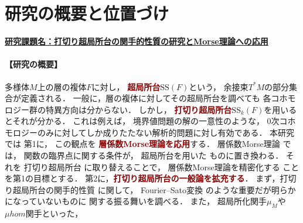 \documentclass[11pt,a4paper,uplatex,dvipdfmx]{ujarticle} 		%
\newcommand{\研究課題名}{打切り超局所台の関手的性質の研究とMorse理論への応用}
\newcommand{\研究機関名}{北海道大学}
\newcommand{\研究代表者氏名}{大柴寿浩}
\begin{document}

\section{研究の概要と位置づけ}

\noindent
\underline{\textbf{研究課題名：\研究課題名}}
\vspace{-10pt}
\paragraph{【研究の概要】}
多様体\(M\)上の層の複体\(F\)に対し，
\textcolor{darkred}{\textbf{超局所台}}\(\mathrm{SS}(F)\)という，
余接束\(T^{\ast}M\)の部分集合が定義される．
一般に，層の複体に対してその超局所台を調べても
各コホモロジー群の特異方向は分からない．
しかし，
\textcolor{darkred}{\textbf{打切り超局所台}}\(
	\mathrm{SS}_{k}(F)
\)を用いるとそれが分かる．
これは例えば，
境界値問題の解の一意性のような，
\(0\)次コホモロジーのみに対してしか成りたたない解析的問題に対し有効である．
本研究では
第1に，
この観点を
\textcolor{darkred}{\textbf{層係数Morse理論を応用}}する．
層係数Morse理論
では，
関数の臨界点に関する条件が，
超局所台を用いた
ものに置き換わる．
それを
打切り超局所台
に取り替えることで，
層係数Morse理論を精密化する
ことを第1の目標とする．
第2に，\textcolor{darkred}{\textbf{打切り超局所台の一般論を拡充する}}．
まず，打切り超局所台の関手的性質
に関して，
Fourier--Sato変換
のような重要だが明らかになっていないものに
関する振る舞いを調べる．
また，
超局所化関手\(\mu_M\)や\(\mu hom\)関手といった，
\end{document}
